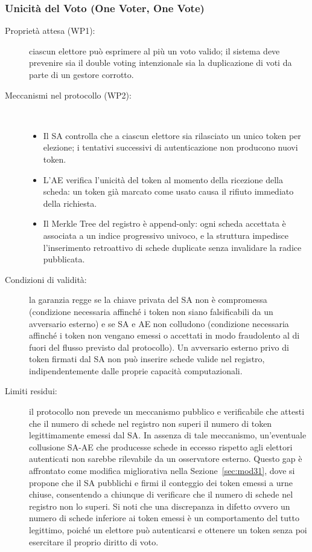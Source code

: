 \documentclass[12pt,a4paper]{article}
\begin{document}
\subsubsection{Unicità del Voto (One Voter, One Vote)}
\begin{description}
  \item[Proprietà attesa (WP1):] ciascun elettore può esprimere al più un voto valido; il sistema deve prevenire sia il double voting intenzionale sia la duplicazione di voti da parte di un gestore corrotto.
  \item[Meccanismi nel protocollo (WP2):] \
    \begin{itemize}
      \item Il SA controlla che a ciascun elettore sia rilasciato un unico token per elezione; i tentativi successivi di autenticazione non producono nuovi token.
      \item L'AE verifica l'unicità del token al momento della ricezione della scheda: un token già marcato come usato causa il rifiuto immediato della richiesta.
      \item Il Merkle Tree del registro è append-only: ogni scheda accettata è associata a un indice progressivo univoco, e la struttura impedisce l'inserimento retroattivo di schede duplicate senza invalidare la radice pubblicata.
    \end{itemize}
  \item[Condizioni di validità:] la garanzia regge se la chiave privata del SA non è compromessa (condizione necessaria affinché i token non siano falsificabili da un avversario esterno) e se SA e AE non colludono (condizione necessaria affinché i token non vengano emessi o accettati in modo fraudolento al di fuori del flusso previsto dal protocollo). Un avversario esterno privo di token firmati dal SA non può inserire schede valide nel registro, indipendentemente dalle proprie capacità computazionali.
  \item[Limiti residui:] il protocollo non prevede un meccanismo pubblico e verificabile che attesti che il numero di schede nel registro non superi il numero di token legittimamente emessi dal SA. In assenza di tale meccanismo, un'eventuale collusione SA-AE che producesse schede in eccesso rispetto agli elettori autenticati non sarebbe rilevabile da un osservatore esterno. Questo gap è affrontato come modifica migliorativa nella Sezione~\ref{sec:mod31}, dove si propone che il SA pubblichi e firmi il conteggio dei token emessi a urne chiuse, consentendo a chiunque di verificare che il numero di schede nel registro non lo superi. Si noti che una discrepanza in difetto ovvero un numero di schede inferiore ai token emessi è un comportamento del tutto legittimo, poiché un elettore può autenticarsi e ottenere un token senza poi esercitare il proprio diritto di voto.
\end{description}
\end{document}
